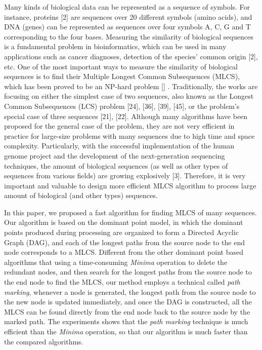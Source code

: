 \documentclass{article}
\begin{document}
Many kinds of biological data can be represented as a sequence of
symbols. For instance, proteins [2] are sequences over 20 different
symbols (amino acids), and DNA (genes) can be represented as sequences
over four symbols A, C, G and T corresponding to the four bases.
Measuring the similarity of biological sequences is a fundamental
problem in bioinformatics, which can be used in many applications such
as cancer diagnoses, detection of the species’ common origin [2],
etc. One of the most important ways to measure the similarity of
biological sequences is to find their Multiple Longest Common
Subsequences (MLCS), which has been proved to be an NP-hard problem []
. Traditionally, the works are focusing on either the simplest case of
two sequences, also known as the Longest Common Subsequences (LCS)
problem [24], [36], [39], [45], or the problem’s special case of
three sequences [21], [22]. Although many algorithms have been
proposed for the general case of the problem, they are not very
efficient in practice for large-size problems with many sequences due
to high time and space complexity. Particularly, with the successful
implementation of the human genome project and the development of the
next-generation sequencing techniques, the amount of biological
sequences (as well as other types of sequences from various fields)
are growing explosively [3]. Therefore, it is very important and
valuable to design more efficient MLCS algorithm to process large
amount of biological (and other types) sequences.

In this paper, we proposed a fast algorithm for finding MLCS of many
sequences. Our algorithm is based on the dominant point model, in
which the dominant points produced during processing are organized to
form a Directed Acyclic Graph (DAG), and each of the longest paths
from the source node to the end node corresponds to a MLCS. Different
from the other dominant point based algorithms that using a
time-consuming \emph{Minima} operation to delete the redundant nodes,
and then search for the longest paths from the source node to the end
node to find the MLCS, our method employs a technical called
\emph{path marking}, whenever a node is generated, the longest path
from the source node to the new node is updated immediately, and once
the DAG is constructed, all the MLCS can be found directly from the
end node back to the source node by the marked path. The experiments
shows that the \emph{path marking} technique is much efficient than
the \emph{Minima} operation, so that our algorithm is much faster than
the compared algorithms.
\end{document}
